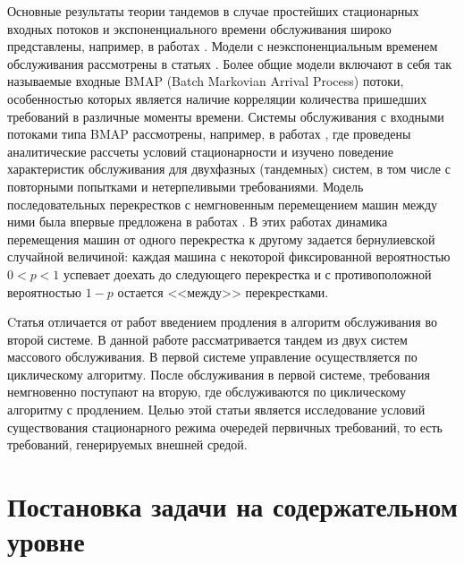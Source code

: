 \documentclass[12pt]{extarticle}
\theoremstyle{theorem}
\theoremstyle{remark}
\begin{document}
Основные результаты теории тандемов в случае простейших стационарных входных потоков и экспоненциального времени обслуживания широко представлены, например, в работах \cite{Balsamo:2003, Gnedenko:Konig:1983, Perros:1994}. Модели с неэкспоненциальным временем обслуживания рассмотрены в статьях \cite{Gomez:2002:1, Gomez:2002:2, Gomez:2002:3}. Более общие модели включают в себя так называемые входные BMAP (Batch Markovian Arrival Process) потоки, особенностью которых является наличие корреляции количества пришедших требований в различные моменты времени. Системы обслуживания с входными потоками типа BMAP рассмотрены, например, в работах \cite{Klimenok:Dudin:2005, Klimenok:2010, Klimenok:2015}, где проведены аналитические рассчеты условий стационарности и изучено поведение характеристик обслуживания для двухфазных (тандемных) систем, в том числе с повторными попытками и нетерпеливыми требованиями. 
Модель последовательных перекрестков с немгновенным перемещением машин между ними была впервые предложена в работах \cite{Zorine:2012,Zorine:2013}. В этих работах динамика перемещения машин от одного перекрестка к другому задается бернулиевской случайной величиной: каждая машина с некоторой фиксированной вероятностью $0<p<1$ успевает доехать до следующего перекрестка и с противоположной вероятностью $1-p$ остается <<между>> перекрестками.

Cтатья \cite{Kocheganov:2017:1} отличается от работ  \cite{Zorine:2012,Zorine:2013} введением продления в алгоритм обслуживания во второй системе. 
В данной работе рассматривается тандем из двух систем массового обслуживания. В первой системе управление осуществляется по циклическому алгоритму. После обслуживания в первой системе, требования немгновенно поступают на вторую, где обслуживаются по циклическому алгоритму с продлением. Целью этой статьи является исследование условий существования стационарного режима очередей первичных требований, то есть требований, генерируемых внешней средой.

\section{Постановка задачи на содержательном уровне}
\end{document}
